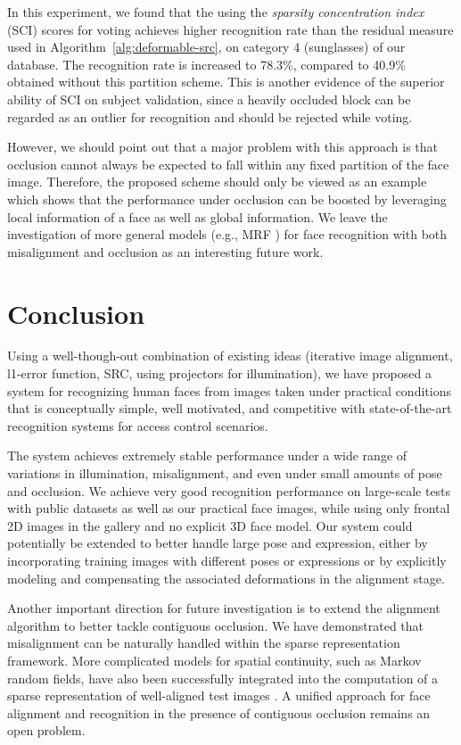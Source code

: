 \documentclass[12pt,journal,draftcls,letterpaper,onecolumn]{IEEEtran}
\begin{document}
In this experiment, we found that the using the \emph{sparsity
concentration index} (SCI) scores for voting achieves higher
recognition rate than the residual measure used in Algorithm~\ref{alg:deformable-src}, on
category 4 (sunglasses) of our database. The recognition rate
is increased to 78.3\%, compared to 40.9\% obtained without
this partition scheme. This is another evidence of the superior
ability of SCI on subject validation, since a heavily occluded
block can be regarded as an outlier for recognition and should
be rejected while voting.

However, we should point out that a major problem with this
approach is that occlusion cannot always be expected to fall within
 any fixed partition of the face image. Therefore, the
proposed scheme should only be viewed as an example which shows
that the performance under occlusion can be boosted by
leveraging local information of a face as well as global information. We 
leave the investigation of more general models (e.g., MRF \cite{ZhouZ2009}) for face
recognition with both misalignment and occlusion as an
interesting future work.

\section{Conclusion}\label{sec:conclusion}
Using a well-though-out combination of existing ideas
(iterative image alignment, l1-error function, SRC, using projectors for
illumination), we have proposed a system for recognizing human faces
from images taken under practical conditions that is conceptually simple, well
motivated, and competitive with state-of-the-art recognition systems for access
control scenarios. 

The system achieves extremely stable performance under
a wide range of variations in illumination, misalignment, and even under small amounts of
pose and occlusion. We achieve very good recognition performance on
large-scale tests with public datasets as well as our practical face
images, while using only frontal 2D images in the gallery and no
explicit 3D face model.
Our system could potentially be extended to better handle large pose
and expression, either by incorporating training images with different poses or
expressions or by explicitly modeling and compensating the associated deformations
in the alignment stage.

Another important direction for future
investigation is to extend the alignment algorithm to better
tackle contiguous occlusion. We have demonstrated that misalignment can be naturally handled within the
sparse representation framework. More complicated models for
spatial continuity, such as Markov random fields, have also
been successfully integrated into the computation of a sparse
representation of well-aligned test images
\cite{Cevher2008-NIPS, ZhouZ2009}. A unified approach
for face alignment and recognition in the presence of
contiguous occlusion remains an open problem.
\end{document}
